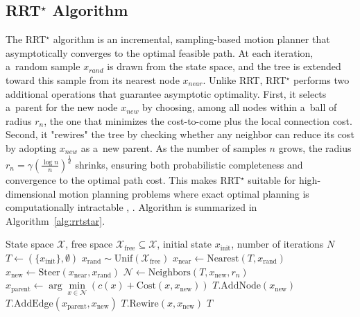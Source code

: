 \documentclass{svproc}
\begin{document}
\subsection{RRT$^\star$ Algorithm}
The RRT$^\star$ algorithm is an incremental, sampling-based motion planner that
asymptotically converges to the optimal feasible path. At each iteration, a~random sample 
$x_{rand}$ is drawn from the state space, and the tree is extended toward this
sample from its nearest node $x_{near}$.
Unlike RRT, RRT$^\star$ performs two additional operations that guarantee asymptotic
optimality. First, it selects a~parent for the new node $x_{new}$ by choosing,
among all nodes within a~ball of radius $r_{n}$, the one that minimizes the
cost-to-come plus the local connection cost. Second, it "rewires" the tree by
checking whether any neighbor can reduce its cost by adopting $x_{new}$ as a~new
parent. As the number of samples $n$ grows, the radius  
$r_{n} = \gamma(\frac{\log{n}}{n})^{\frac{1}{d}}$ shrinks, ensuring both
probabilistic completeness and convergence to the optimal path cost.
This makes RRT$^\star$ suitable for high-dimensional motion planning problems where
exact optimal planning is computationally intractable
\cite{karaman2010incrementalsamplingbasedalgorithmsoptimal},
\cite{karaman2011samplingbasedalgorithmsoptimalmotion}.
Algorithm is summarized in Algorithm~\ref{alg:rrtstar}.
\begin{algorithm}[t]
\caption{Classical RRT$^\star$ algorithm}
\label{alg:rrtstar}
\begin{algorithmic}[1]
\REQUIRE State space $\mathcal{X}$, free space $\mathcal{X}_{\mathrm{free}} \subseteq \mathcal{X}$, 
initial state $x_{\mathrm{init}}$, number of iterations $N$
\STATE $T \gets (\{x_{\mathrm{init}}\}, \emptyset)$
    \STATE $x_{\mathrm{rand}} \sim \mathrm{Unif}(\mathcal{X}_{\mathrm{free}})$
    \STATE $x_{\mathrm{near}} \gets \mathrm{Nearest}(T, x_{\mathrm{rand}})$
    \STATE $x_{\mathrm{new}} \gets \mathrm{Steer}(x_{\mathrm{near}}, x_{\mathrm{rand}})$
        \STATE $\mathcal{N} \gets \mathrm{Neighbors}(T, x_{\mathrm{new}}, r_n)$
        \STATE $x_{\mathrm{parent}} \gets \arg\min\limits_{x \in \mathcal{N}} 
            \left( c(x) + \mathrm{Cost}(x, x_{\mathrm{new}}) \right)$
        \STATE $T.\mathrm{AddNode}(x_{\mathrm{new}})$
        \STATE $T.\mathrm{AddEdge}(x_{\mathrm{parent}}, x_{\mathrm{new}})$
                \STATE $T.\mathrm{Rewire}(x, x_{\mathrm{new}})$
            \ENDIF
        \ENDFOR
    \ENDIF
\ENDFOR
\STATE \RETURN $T$
\end{algorithmic}
\end{algorithm}
\end{document}
